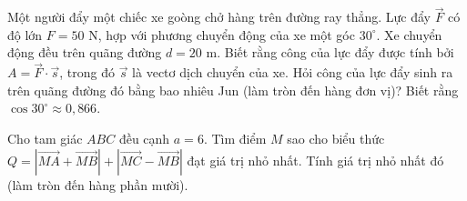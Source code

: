 \begin{bt}%
	Một người đẩy một chiếc xe goòng chở hàng trên đường ray thẳng. Lực đẩy $\overrightarrow{F}$ có độ lớn $F=50$ N, hợp với phương chuyển động của xe một góc $30^\circ$. Xe chuyển động đều trên quãng đường $d=20$ m. Biết rằng công của lực đẩy được tính bởi $A=\overrightarrow{F}\cdot\overrightarrow{s}$, trong đó $\overrightarrow{s}$ là vectơ dịch chuyển của xe. Hỏi công của lực đẩy sinh ra trên quãng đường đó bằng bao nhiêu Jun (làm tròn đến hàng đơn vị)? Biết rằng $\cos 30^\circ\approx 0{,}866$.
	
\end{bt}

\begin{bt}%
Cho tam giác $ABC$ đều cạnh $a=6$. Tìm điểm $M$ sao cho biểu thức $Q=\left|\overrightarrow{MA}+\overrightarrow{MB}\right|+\left|\overrightarrow{MC}-\overrightarrow{MB}\right|$ đạt giá trị nhỏ nhất. Tính giá trị nhỏ nhất đó (làm tròn đến hàng phần mười).

\end{bt}

